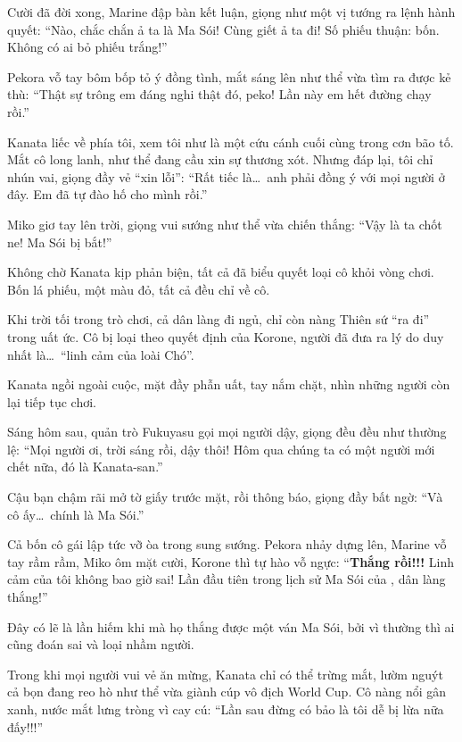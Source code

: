 \documentclass[../main.tex]{subfiles}
\begin{document}
Cười đã đời xong, Marine đập bàn kết luận, giọng như một vị tướng ra lệnh hành quyết: ``Nào, chắc chắn ả ta là Ma Sói! Cùng giết ả ta đi! Số phiếu thuận: bốn. Không có ai bỏ phiếu trắng!''

Pekora vỗ tay bôm bốp tỏ ý đồng tình, mắt sáng lên như thể vừa tìm ra được kẻ thù: ``Thật sự trông em đáng nghi thật đó, peko! Lần này em hết đường chạy rồi.''

Kanata liếc về phía tôi, xem tôi như là một cứu cánh cuối cùng trong cơn bão tố. Mắt cô long lanh, như thể đang cầu xin sự thương xót. Nhưng đáp lại, tôi chỉ nhún vai, giọng đầy vẻ ``xin lỗi'': ``Rất tiếc là\dots\ anh phải đồng ý với mọi người ở đây. Em đã tự đào hố cho mình rồi.''

Miko giơ tay lên trời, giọng vui sướng như thể vừa chiến thắng: ``Vậy là ta chốt ne! Ma Sói bị bắt!''

Không chờ Kanata kịp phản biện, tất cả đã biểu quyết loại cô khỏi vòng chơi. Bốn lá phiếu, một màu đỏ, tất cả đều chỉ về cô.

Khi trời tối trong trò chơi, cả dân làng đi ngủ, chỉ còn nàng Thiên sứ ``ra đi'' trong uất ức. Cô bị loại theo quyết định của Korone, người đã đưa ra lý do duy nhất là\dots\ ``linh cảm của loài Chó''.


Kanata ngồi ngoài cuộc, mặt đầy phẫn uất, tay nắm chặt, nhìn những người còn lại tiếp tục chơi.

Sáng hôm sau, quản trò Fukuyasu gọi mọi người dậy, giọng đều đều như thường lệ: ``Mọi người ơi, trời sáng rồi, dậy thôi! Hôm qua chúng ta có một người mới chết nữa, đó là Kanata-san.''

Cậu bạn chậm rãi mở tờ giấy trước mặt, rồi thông báo, giọng đầy bất ngờ: ``Và cô ấy\dots\ chính là Ma Sói.''

Cả bốn cô gái lập tức vỡ òa trong sung sướng. Pekora nhảy dựng lên, Marine vỗ tay rầm rầm, Miko ôm mặt cười, Korone thì tự hào vỗ ngực: ``\textbf{Thắng rồi!!!} Linh cảm của tôi không bao giờ sai! Lần đầu tiên trong lịch sử Ma Sói của \hll, dân làng thắng!''

Đây có lẽ là lần hiếm khi mà họ thắng được một ván Ma Sói, bởi vì thường thì ai cũng đoán sai và loại nhầm người.

Trong khi mọi người vui vẻ ăn mừng, Kanata chỉ có thể trừng mắt, lườm nguýt cả bọn đang reo hò như thể vừa giành cúp vô địch World Cup. Cô nàng nổi gân xanh, nước mắt lưng tròng vì cay cú: ``Lần sau đừng có bảo là tôi dễ bị lừa nữa đấy!!!''
\end{document}
